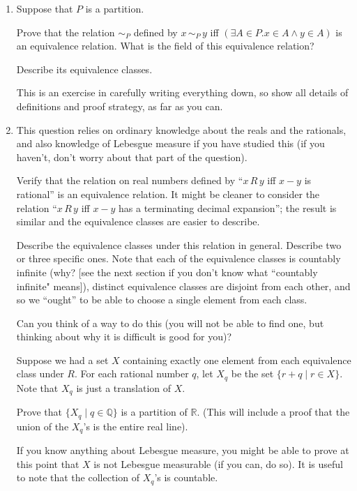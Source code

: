 \documentclass[12pt]{book}
\begin{document}
\begin{enumerate}

\item  
Suppose that $P$ is a partition.  

Prove that the relation $\sim_P$ defined by \newline $x \,\sim_P\, y$ iff
$(\exists A \in P.x \in A \wedge y \in A)$ \newline is an equivalence relation.
What is the field of this equivalence relation?

Describe its equivalence classes.  

This is an exercise in carefully writing everything down, so show all
details of definitions and proof strategy, as far as you can.


\item
This question relies on ordinary knowledge about the reals and the
rationals, and also knowledge of Lebesgue measure if you have studied
this (if you haven't, don't worry about that part of the question).

Verify that the relation on real numbers defined by ``$x\,R\,y$ iff
$x-y$ is rational'' is an equivalence relation.  It might be cleaner to consider the 
relation ``$x\,R\,y$ iff
$x-y$ has a terminating decimal expansion''; the result is similar and the equivalence classes are easier to describe.

Describe the equivalence classes under this relation in general.
Describe two or three specific ones.  Note that each of the
equivalence classes is countably infinite (why? [see the next section if you don't know what ``countably infinite" means]), distinct equivalence
classes are disjoint from each other, and so we ``ought'' to be able
to choose a single element from each class.  

Can you think of a way to do this (you will not be able to find one,
but thinking about why it is difficult is good for you)?

Suppose we had a set $X$ containing exactly one element from each
equivalence class under $R$.  For each rational number $q$, let $X_q$
be the set $\{r+q \mid r \in X\}$.  Note that $X_q$ is just a
translation of $X$.

Prove that $\{X_q \mid q \in {\mathbb Q}\}$ is a partition of $\mathbb
R$.  (This will include a proof that the union of the $X_q$'s is the
entire real line).

If you know anything about Lebesgue measure, you might be able to
prove at this point that $X$ is not Lebesgue measurable (if you can,
do so).  It is useful to note that the collection of $X_q$'s is
countable.


\end{enumerate}
\end{document}
